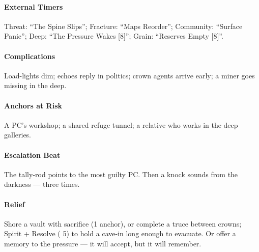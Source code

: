 \paragraph{External Timers} Threat: ``The Spine Slips''; Fracture: ``Maps Reorder''; Community: ``Surface Panic''; Deep: ``The Pressure Wakes [8]''; Grain: ``Reserves Empty [8]''.
\paragraph{Complications} Load-lights dim; echoes reply in politics; crown agents arrive early; a miner goes missing in the deep.
\paragraph{Anchors at Risk} A PC's workshop; a shared refuge tunnel; a relative who works in the deep galleries.
\paragraph{Escalation Beat} The tally-rod points to the most guilty PC. Then a knock sounds from the darkness --- three times.
\paragraph{Relief} Shore a vault with sacrifice (1 anchor), or complete a truce between crowns; Spirit + Resolve (\DV{} 5) to hold a cave-in long enough to evacuate. Or offer a memory to the pressure --- it will accept, but it will remember.

